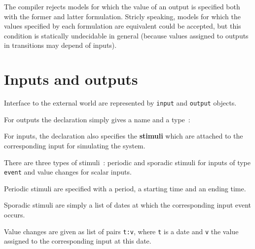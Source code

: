 The compiler rejects models for which the value of an output is specified both with the former and
latter formulation. Stricly speaking, models for which the values specified by each formulation are
equivalent could be accepted, but this condition is statically undecidable in general (because
values assigned to outputs in transitions may depend of inputs).


\section{Inputs and outputs}
\label{sec:inputs-outputs}

Interface to the external world are represented by \verb|input| and \verb|output| objects.

\medskip
\step For outputs the declaration simply gives a name and a type~:

\begin{center}
\end{center}

\step For inputs, the declaration also specifies the \textbf{stimuli} which are attached to the
corresponding input for simulating the system.
\begin{center}
\end{center}

There are three types of stimuli~:
periodic and
sporadic stimuli for inputs of type \verb|event| and value changes for scalar inputs.

\medskip
Periodic stimuli are specified with a period, a starting time and an ending time.

\begin{center}
\end{center}

Sporadic stimuli
are simply a list of dates at which the corresponding input event occurs.

\begin{center}
\end{center}

Value changes are given as
list of pairs \verb|t:v|, where \verb|t| is a date and \verb|v| the value assigned to the
corresponding input at this date. 

\begin{center}
\end{center}

